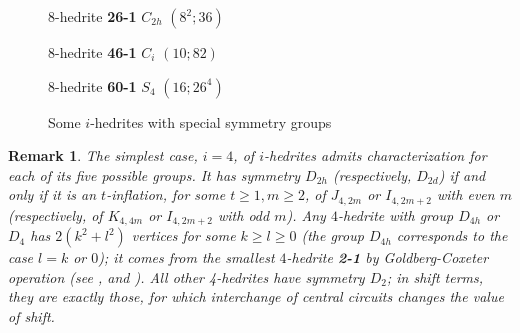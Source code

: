 \documentclass[12pt]{article}
\newtheorem{remark}{Remark}
\begin{document}
\begin{figure}
{\begin{minipage}[t]{4cm}
\epsfxsize=4cm
\par
{$8$-hedrite {\bf 26-1} $C_{2h}$ $(8^2; 36)$}
\end{minipage}
\setlength{\unitlength}{1cm}
\begin{minipage}[t]{4cm}
\centering
\epsfxsize=4cm
\par
{$8$-hedrite {\bf 46-1} $C_i$ $(10; 82)$}
\end{minipage}
\begin{minipage}[t]{4cm}
\centering
\epsfxsize=4cm
\par
{$8$-hedrite {\bf 60-1} $S_4$ $(16;26^4)$}
\end{minipage}
}
\caption{Some $i$-hedrites with special symmetry groups}
\label{special-i-hedrites}
\end{figure}








\begin{remark}
The simplest case, $i=4$, of $i$-hedrites admits characterization for each of
its five possible groups.
It has symmetry $D_{2h}$  (respectively, $D_{2d}$) if and only if it is an
$t$-inflation, for some $t \ge 1, m \ge 2$, of $J_{4,2m}$ or $I_{4,2m+2}$
with even $m$ (respectively, of $K_{4,4m}$ or $I_{4,2m+2}$ with odd $m$).
Any $4$-hedrite with group $D_{4h}$ or $D_4$ has $2(k^2+l^2)$ vertices for
some $k \ge l \ge 0$ (the group $D_{4h}$ corresponds to the case $l=k$ or $0$);
it comes from the smallest $4$-hedrite {\bf 2-1} by Goldberg-Coxeter
operation (see \cite{Gold37}, \cite{Cox71} and \cite{DD03}).
All other 4-hedrites have symmetry $D_2$; in shift terms, they are exactly those, for which interchange of central circuits changes the value of shift.
\end{remark}
\end{document}
